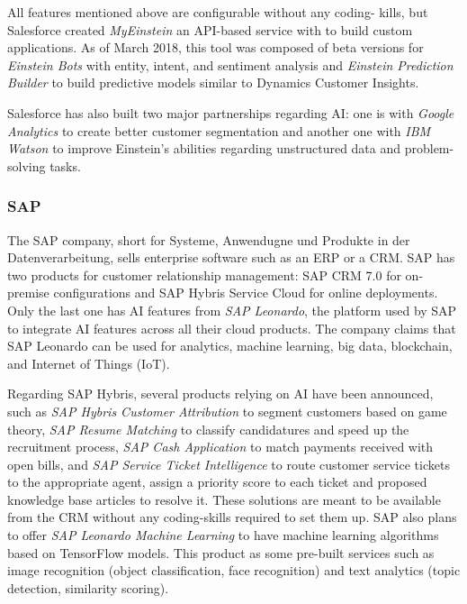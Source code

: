 All features mentioned above are configurable without any coding- kills, but Salesforce created \textit{MyEinstein} an API-based service with to build custom applications. As of March 2018, this tool was composed of beta versions for \textit{Einstein Bots} with entity, intent, and sentiment analysis and \textit{Einstein Prediction Builder} to build predictive models similar to Dynamics Customer Insights.

Salesforce has also built two major partnerships regarding AI: one is with \textit{Google Analytics} to create better customer segmentation and another one with \textit{IBM Watson} to improve Einstein's abilities regarding unstructured data and problem-solving tasks.

\subsubsection*{SAP}
The SAP company, short for Systeme, Anwendugne und Produkte in der Datenverarbeitung, sells enterprise software such as an ERP or a CRM. SAP has two products for customer relationship management: SAP CRM 7.0 for on-premise configurations and SAP Hybris Service Cloud for online deployments. Only the last one has AI features from \textit{SAP Leonardo}, the platform used by SAP to integrate AI features across all their cloud products. The company claims that SAP Leonardo can be used for analytics, machine learning, big data, blockchain, and Internet of Things (IoT).

Regarding SAP Hybris, several products relying on AI have been announced, such as \textit{SAP Hybris Customer Attribution} to segment customers based on game theory, \textit{SAP Resume Matching} to classify candidatures and speed up the recruitment process, \textit{SAP Cash Application} to match payments received with open bills, and \textit{SAP Service Ticket Intelligence} to route customer service tickets to the appropriate agent, assign a priority score to each ticket and proposed knowledge base articles to resolve it. These solutions are meant to be available from the CRM without any coding-skills required to set them up. SAP also plans to offer \textit{SAP Leonardo Machine Learning} to have machine learning algorithms based on TensorFlow models. This product as some pre-built services such as image recognition (object classification, face recognition) and text analytics (topic detection, similarity scoring). 

